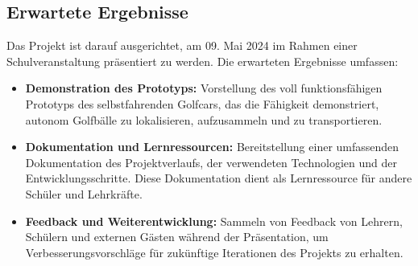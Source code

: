\subsection{Erwartete Ergebnisse}
Das Projekt ist darauf ausgerichtet, am 09. Mai 2024 im Rahmen einer Schulveranstaltung präsentiert zu werden. Die erwarteten Ergebnisse umfassen:

\begin{itemize}
  \item \textbf{Demonstration des Prototyps:} Vorstellung des voll funktionsfähigen Prototyps des selbstfahrenden Golfcars, das die Fähigkeit demonstriert, autonom Golfbälle zu lokalisieren, aufzusammeln und zu transportieren.
  \item \textbf{Dokumentation und Lernressourcen:} Bereitstellung einer umfassenden Dokumentation des Projektverlaufs, der verwendeten Technologien und der Entwicklungsschritte. Diese Dokumentation dient als Lernressource für andere Schüler und Lehrkräfte.
  \item \textbf{Feedback und Weiterentwicklung:} Sammeln von Feedback von Lehrern, Schülern und externen Gästen während der Präsentation, um Verbesserungsvorschläge für zukünftige Iterationen des Projekts zu erhalten.
\end{itemize}